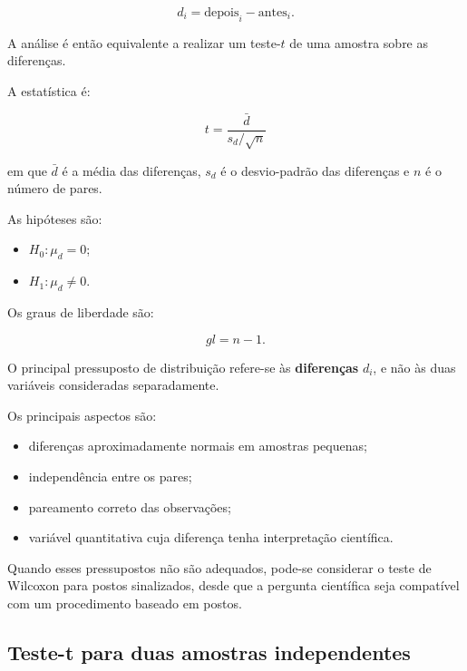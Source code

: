 \begin{equation}
  d_i=\text{depois}_i-\text{antes}_i.
\end{equation}

A análise é então equivalente a realizar um teste-$t$ de uma amostra sobre
as diferenças.

A estatística é:

\begin{equation}
  t=
  \frac{\bar d}
  {s_d/\sqrt{n}}
\end{equation}

em que $\bar d$ é a média das diferenças, $s_d$ é o desvio-padrão das
diferenças e $n$ é o número de pares.

As hipóteses são:

\begin{itemize}
    \item $H_0:\mu_d=0$;
    \item $H_1:\mu_d\neq0$.
\end{itemize}

Os graus de liberdade são:

\[
gl=n-1.
\]

\begin{deepdive}
O principal pressuposto de distribuição refere-se às \textbf{diferenças}
$d_i$, e não às duas variáveis consideradas separadamente.

Os principais aspectos são:

\begin{itemize}
    \item diferenças aproximadamente normais em amostras pequenas;
    \item independência entre os pares;
    \item pareamento correto das observações;
    \item variável quantitativa cuja diferença tenha interpretação científica.
\end{itemize}

Quando esses pressupostos não são adequados, pode-se considerar o teste de
Wilcoxon para postos sinalizados, desde que a pergunta científica seja
compatível com um procedimento baseado em postos.
\end{deepdive}

\subsection{Teste-t para duas amostras independentes}

